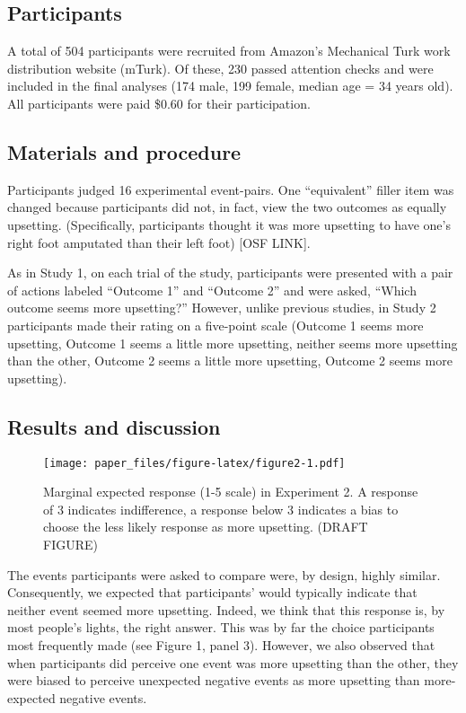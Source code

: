 \documentclass[12pt,]{article}
\begin{document}
\subsection{Participants}\label{participants-1}

A total of 504 participants were recruited from Amazon's Mechanical Turk
work distribution website (mTurk). Of these, 230 passed attention checks
and were included in the final analyses (174 male, 199 female, median
age = 34 years old). All participants were paid \$0.60 for their
participation.

\subsection{Materials and procedure}\label{materials-and-procedure-1}

Participants judged 16 experimental event-pairs. One ``equivalent''
filler item was changed because participants did not, in fact, view the
two outcomes as equally upsetting. (Specifically, participants thought
it was more upsetting to have one's right foot amputated than their left
foot) {[}OSF LINK{]}.

As in Study 1, on each trial of the study, participants were presented
with a pair of actions labeled ``Outcome 1'' and ``Outcome 2'' and were
asked, ``Which outcome seems more upsetting?'' However, unlike previous
studies, in Study 2 participants made their rating on a five-point scale
(Outcome 1 seems more upsetting, Outcome 1 seems a little more
upsetting, neither seems more upsetting than the other, Outcome 2 seems
a little more upsetting, Outcome 2 seems more upsetting).

\subsection{Results and discussion}\label{results-and-discussion-1}

\begin{figure}
\centering
\texttt{[image: paper\_files/figure-latex/figure2-1.pdf]}
\caption{Marginal expected response (1-5 scale) in Experiment 2. A
response of 3 indicates indifference, a response below 3 indicates a
bias to choose the less likely response as more upsetting. (DRAFT
FIGURE)}
\end{figure}

The events participants were asked to compare were, by design, highly
similar. Consequently, we expected that participants' would typically
indicate that neither event seemed more upsetting. Indeed, we think that
this response is, by most people's lights, the right answer. This was by
far the choice participants most frequently made (see Figure 1, panel
3). However, we also observed that when participants did perceive one
event was more upsetting than the other, they were biased to perceive
unexpected negative events as more upsetting than more-expected negative
events.
\end{document}
